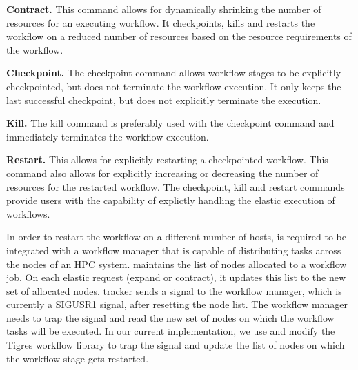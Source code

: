 \noindent \textbf{Contract.} This command allows for dynamically shrinking
the number of resources for an executing workflow. It checkpoints, kills and
restarts the workflow on a reduced number of resources based on the resource
requirements of the workflow.

\noindent \textbf{Checkpoint.} The checkpoint command allows workflow stages
to be explicitly checkpointed, but does not terminate the workflow execution.
It only keeps the last successful checkpoint, but does not explicitly terminate
the execution. 

\noindent \textbf{Kill.} The kill command is preferably used with the checkpoint
command and immediately terminates the workflow execution.

\noindent \textbf{Restart.} This allows for explicitly restarting a checkpointed
workflow. This command also allows for explicitly increasing or decreasing
the number of resources for the restarted workflow. The checkpoint, kill and
restart commands provide users with the capability of explictly handling
the elastic execution of workflows.

In order to restart the workflow on a different number of hosts, \systemname
is required to be integrated with a workflow manager that is capable
of distributing tasks across the nodes of an HPC system. \systemname
maintains the list of nodes allocated to a workflow job. On each elastic
request (expand or contract), it updates this list to the new set of allocated
nodes. \systemname tracker sends a signal to the workflow manager, which
is currently a SIGUSR1 signal, after resetting the node list. The workflow
manager needs to trap the signal and read the new set of nodes on which
the workflow tasks will be executed. In our current implementation, we
use and modify the Tigres workflow library to trap the signal and update
the list of nodes on which the workflow stage gets restarted.


